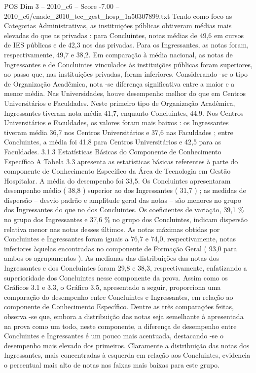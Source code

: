 \begin{textsample}{POS Dim 3 – 2010\_c6 – Score -7.00 – 2010\_c6/enade\_2010\_tec\_gest\_hosp\_1a50307899.txt}
Tendo como foco as Categorias Administrativas, as instituições públicas obtiveram médias mais elevadas do que as privadas : para Concluintes, notas médias de 49,6 em cursos de IES públicas e de 42,3 nos das privadas.
Para os Ingressantes, as notas foram, respectivamente, 49,7 e 38,2.
Em comparação à média nacional, as notas de Ingressantes e de Concluintes vinculados às instituições públicas foram superiores, ao passo que, nas instituições privadas, foram inferiores.
Considerando -se o tipo de Organização Acadêmica, nota -se diferença significativa entre a maior e a menor média.
Nas Universidades, houve desempenho melhor do que em Centros Universitários e Faculdades.
Neste primeiro tipo de Organização Acadêmica, Ingressantes tiveram nota média 41,7, enquanto Concluintes, 44,9.
Nos Centros Universitários e Faculdades, os valores foram mais baixos : os Ingressantes tiveram média 36,7 nos Centros Universitários e 37,6 nas Faculdades ; entre Concluintes, a média foi 41,8 para Centros Universitários e 42,5 para as Faculdades. 3.1.3 Estatísticas Básicas do Componente de Conhecimento Específico A Tabela 3.3 apresenta as estatísticas básicas referentes à parte do componente de Conhecimento Específico da Área de Tecnologia em Gestão Hospitalar.
A média do desempenho foi 33,5.
Os Concluintes apresentaram desempenho médio ( 38,8 ) superior ao dos Ingressantes ( 31,7 ) ; as medidas de dispersão – desvio padrão e amplitude geral das notas – são menores no grupo dos Ingressantes do que no dos Concluintes.
Os coeficientes de variação, 39,1 \% no grupo dos Ingressantes e 37,6 \% no grupo dos Concluintes, indicam dispersão relativa menor nas notas desses últimos.
As notas máximas obtidas por Concluintes e Ingressantes foram iguais a 76,7 e 74,0, respectivamente, notas inferiores àquelas encontradas no componente de Formação Geral ( 93,0 para ambos os agrupamentos ).
As medianas das distribuições das notas dos Ingressantes e dos Concluintes foram 29,8 e 38,3, respectivamente, enfatizando a superioridade dos Concluintes nesse componente da prova.
Assim como os Gráficos 3.1 e 3.3, o Gráfico 3.5, apresentado a seguir, proporciona uma comparação do desempenho entre Concluintes e Ingressantes, em relação ao componente de Conhecimento Específico.
Dentre as três comparações feitas, observa -se que, embora a distribuição das notas seja semelhante à apresentada na prova como um todo, neste componente, a diferença de desempenho entre Concluintes e Ingressantes é um pouco mais acentuada, destacando -se o desempenho mais elevado dos primeiros.
Claramente a distribuição das notas dos Ingressantes, mais concentradas à esquerda em relação aos Concluintes, evidencia o percentual mais alto de notas nas faixas mais baixas para este grupo.

\end{textsample}
